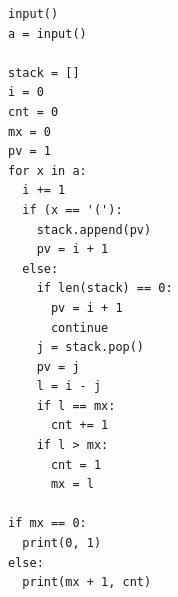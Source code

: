 

\begin{latin}
\begin{lstlisting}
input()
a = input()

stack = []
i = 0
cnt = 0
mx = 0
pv = 1
for x in a:
  i += 1
  if (x == '('):
    stack.append(pv)
    pv = i + 1
  else:
    if len(stack) == 0:
      pv = i + 1
      continue
    j = stack.pop()
    pv = j
    l = i - j
    if l == mx:
      cnt += 1
    if l > mx:
      cnt = 1
      mx = l

if mx == 0:
  print(0, 1)
else:
  print(mx + 1, cnt)
\end{lstlisting}
\end{latin}

